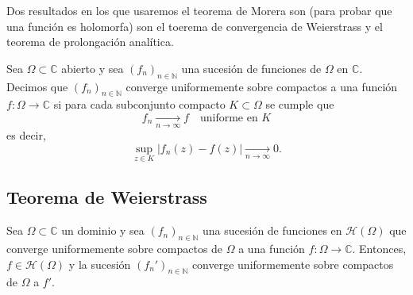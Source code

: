 Dos resultados en los que usaremos el teorema de Morera son (para probar que una función es holomorfa) son el toerema de convergencia de Weierstrass y el teorema de prolongación analítica.

\begin{definición} 
    Sea $\Omega \subset \mathbb{C}$ abierto y sea $(f_n)_{n \in \mathbb{N}}$ una sucesión de funciones de $\Omega$ en $\mathbb{C}$.\\
    Decimos que $(f_n)_{n \in \mathbb{N}}$ converge uniformemente sobre compactos a una función $f : \Omega \to \mathbb{C}$ si para cada subconjunto compacto $K \subset \Omega$ se cumple que
    \[
        f_n \xrightarrow[n \to \infty]{} f \quad \text{uniforme en } K
    \]
    es decir, 
    \[
        \sup_{z \in K} |f_n(z) - f(z)| \xrightarrow[n \to \infty]{} 0.
    \]
\end{definición}

\subsection{Teorema de Weierstrass}
\begin{teorema} 
    Sea $\Omega \subset \mathbb{C}$ un dominio y sea $(f_n)_{n \in \mathbb{N}}$ una sucesión de funciones en $\mathcal{H}(\Omega)$ que converge uniformemente sobre compactos de $\Omega$ a una función $f : \Omega \to \mathbb{C}$. Entonces, $f \in \mathcal{H}(\Omega)$ y la sucesión $(f_n')_{n \in \mathbb{N}}$ converge uniformemente sobre compactos de $\Omega$ a $f'$.
\end{teorema}


